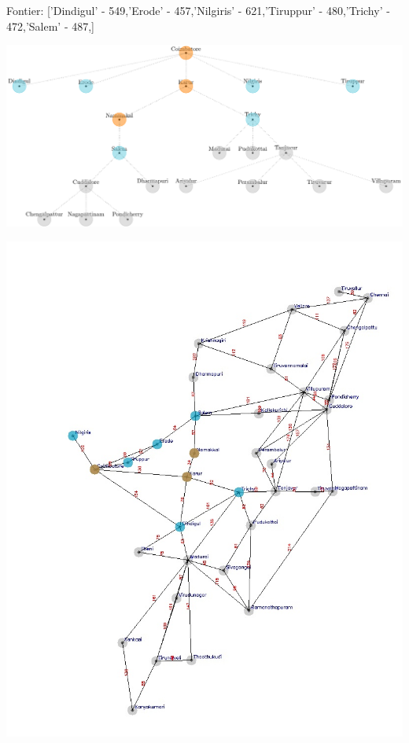 \documentclass[xcolor=table]{beamer}
\begin{document}
\begin{frame}
  { \tiny Fontier: ['Dindigul' - 549,'Erode' - 457,'Nilgiris' - 621,'Tiruppur' - 480,'Trichy' - 472,'Salem' - 487,]}
  \begin{center}
  \includegraphics[height=0.35\textheight]{../AStarNode/5-1.png}
  \end{center}
  \begin{center}
    \includegraphics[height=0.55\textheight]{../AStaroutput/tamilAStar3.jpg}
  \end{center}
\end{frame}
\end{document}
